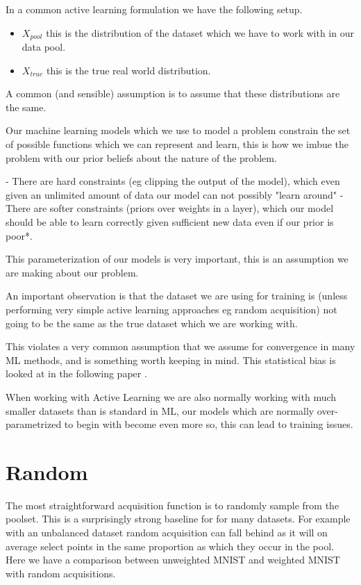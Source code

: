 \documentclass[12pt, a4paper]{report}
\theoremstyle{definition}
\theoremstyle{definition}
\theoremstyle{definition}
\begin{document}
In a common active learning formulation we have the following setup.

\begin{itemize}
    \item $X_{pool}$ this is the distribution of the dataset which we have to work with in our data pool.
    \item $X_{true}$ this is the true real world distribution.
\end{itemize}

A common (and sensible) assumption is to assume that these distributions are the same.

Our machine learning models which we use to model a problem constrain the set of possible functions which we can represent and learn, this is how we imbue the problem with our prior beliefs about the nature of the problem.

- There are hard constraints (eg clipping the output of the model), which even given an unlimited amount of data our model can not possibly "learn around"
- There are softer constraints (priors over weights in a layer), which our model should be able to learn correctly given sufficient new data even if our prior is poor*.

This parameterization of our models is very important, this is an assumption we are making about our problem.

An important observation is that the dataset we are using for training is (unless performing very simple active learning approaches eg random acquisition) not going to be the same as the true dataset which we are working with. 

This violates a very common assumption that we assume for convergence in many ML methods, and is something worth keeping in mind. This statistical bias is looked at in the following paper \cite{farquhar2021statistical}.

When working with Active Learning we are also normally working with much smaller datasets than is standard in ML, our models which are normally over-parametrized to begin with become even more so, this can lead to training issues.

\section{Random}

The most straightforward acquisition function is to randomly sample from the poolset. This is a surprisingly strong baseline for for many datasets. For example with an unbalanced dataset random acquisition can fall behind as it will on average select points in the same proportion as which they occur in the pool. Here we have a comparison between unweighted MNIST and weighted MNIST with random acquisitions.
\end{document}
